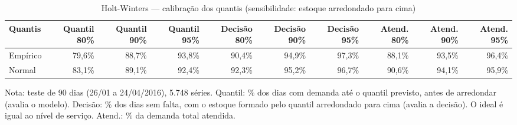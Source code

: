 \begin{table}[htbp]
\centering
\small
\caption{Holt-Winters — calibração dos quantis (sensibilidade: estoque arredondado para cima)}
\label{tab:hw_calibracao_sensibilidade}
\begin{tabular}{lrrrrrrrrr}
\toprule
Quantis & Quantil 80\% & Quantil 90\% & Quantil 95\% & Decisão 80\% & Decisão 90\% & Decisão 95\% & Atend. 80\% & Atend. 90\% & Atend. 95\% \\
\midrule
Empírico & 79,6\% & 88,7\% & 93,8\% & 90,4\% & 94,9\% & 97,3\% & 88,1\% & 93,5\% & 96,4\% \\
Normal & 83,1\% & 89,1\% & 92,4\% & 92,3\% & 95,2\% & 96,7\% & 90,6\% & 94,1\% & 95,9\% \\
\bottomrule
\end{tabular}
\par\smallskip
{\footnotesize Nota: teste de 90 dias (26/01 a 24/04/2016), 5.748 séries. Quantil: \% dos dias com demanda até o quantil previsto, antes de arredondar (avalia o modelo). Decisão: \% dos dias sem falta, com o estoque formado pelo quantil arredondado para cima (avalia a decisão). O ideal é igual ao nível de serviço. Atend.: \% da demanda total atendida.}
\end{table}
